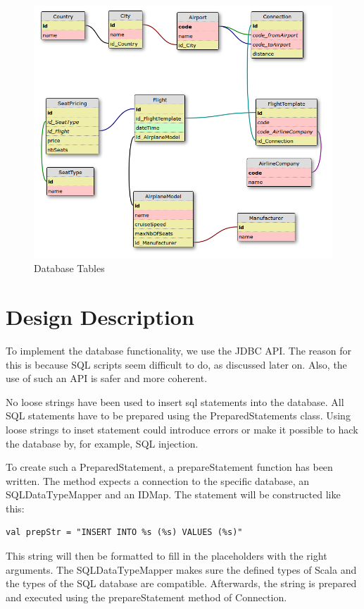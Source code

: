 \documentclass[a4paper]{article}
\begin{document}
\begin{figure}[ht!]
  \includegraphics[width=1.0\textwidth]{../analysis/dbtables-diagram.png}
  \caption{Database Tables}\label{fig:database-tables}
\end{figure}

\section{Design Description}
\label{sec:design-description}


To implement the database functionality, we use the JDBC API. 
The reason for this is because SQL scripts seem difficult to do, as discussed later on. %
Also, the use of such an API is safer and more coherent.

No loose strings have been used to insert sql statements into the database.
All SQL statements have to be prepared using the PreparedStatements class.
Using loose strings to inset statement could introduce errors or make it possible to hack the database by, for example, SQL injection.

To create such a PreparedStatement, a prepareStatement function has been written.
The method expects a connection to the specific database, an SQLDataTypeMapper and an IDMap.
The statement will be constructed like this:
\begin{verbatim}
val prepStr = "INSERT INTO %s (%s) VALUES (%s)"
\end{verbatim}
This string will then be formatted to fill in the placeholders with the right arguments.
The SQLDataTypeMapper makes sure the defined types of Scala and the types of the SQL database are compatible.
Afterwards, the string is prepared and executed using the prepareStatement method of Connection.
\end{document}
